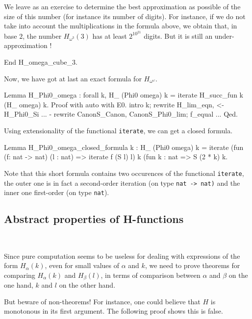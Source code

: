 \documentclass[a4paper]{book}
\begin{document}
We leave as an exercise to determine the best approximation as possible of
 the size of this number (for instance its number of digits).  For instance, if
we do not take into account the multiplications in the formula above,
we obtain that, in base $2$, the number $H_{\omega^3}(3)$ has at least
$2^{10^{21}}$  digits. But it is still an under-approximation !


\begin{Coqsrc}
End H_omega_cube_3.
\end{Coqsrc}




Now, we have got at last an exact formula for $H_{\omega^\omega}$.

\begin{Coqsrc}
Lemma H_Phi0_omega : forall k, H_ (Phi0 omega) k =
                               iterate H_succ_fun  k (H_ omega) k.
Proof with auto with E0.
  intro k; rewrite H_lim_eqn, <- H_Phi0_Si ...
  -  rewrite CanonS_Canon, CanonS_Phi0_lim;  f_equal ...
Qed.
\end{Coqsrc}

Using extensionality of the functional \texttt{iterate}, we can get a closed formula.

\begin{Coqsrc}
Lemma H_Phi0_omega_closed_formula k :
  H_ (Phi0 omega) k =
  iterate (fun (f: nat -> nat) (l : nat) => iterate  f (S l) l)
               k
               (fun k : nat => S (2 * k)%
               k.
\end{Coqsrc}




Note that this short formula contains two occurences of the functional \texttt{iterate}, the outer one is in fact a second-order iteration (on type \texttt{nat -> nat)}
and the inner one  first-order (on type \texttt{nat}). 


\subsection{Abstract properties of H-functions}
~\label{sect:H-alpha-prop} 

Since pure computation seems to be useless for dealing with expressions of the form $H_\alpha(k)$, even for small values of $\alpha$ and $k$, we need to prove theorems for comparing $H_\alpha(k)$ and $H_\beta(l)$, in terms of comparison
between $\alpha$ and $\beta$ on the one hand, $k$ and $l$ on the other hand.

But beware of non-theorems! For instance, one could believe that $H$ is monotonous in its first argument. The following proof shows this is false.
\end{document}

